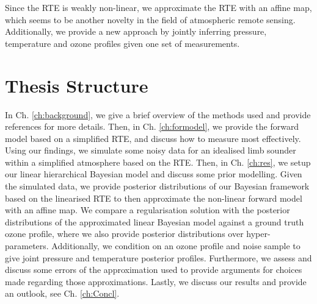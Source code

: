 Since the RTE is weakly non-linear, we approximate the RTE with an affine map, which seems to be another novelty in the field of atmospheric remote sensing.
Additionally, we provide a new approach by jointly inferring pressure, temperature and ozone profiles given one set of measurements.



\section{Thesis Structure}
In Ch. \ref{ch:background}, we give a brief overview of the methods used and provide references for more details.
Then, in Ch. \ref{ch:formodel}, we provide the forward model based on a simplified RTE, and discuss how to measure most effectively.
Using our findings, we simulate some noisy data for an idealised limb sounder within a simplified atmosphere based on the RTE.
Then, in Ch. \ref{ch:res}, we setup our linear hierarchical Bayesian model and discuss some prior modelling.
Given the simulated data, we provide posterior distributions of our Bayesian framework based on the linearised RTE to then approximate the non-linear forward model with an affine map. 
We compare a regularisation solution with the posterior distributions of the approximated linear Bayesian model against a ground truth ozone profile, where we also provide posterior distributions over hyper-parameters.
Additionally, we condition on an ozone profile and noise sample to give joint pressure and temperature posterior profiles.
Furthermore, we assess and discuss some errors of the approximation used to provide arguments for choices made regarding those approximations.
Lastly, we discuss our results and provide an outlook, see Ch. \ref{ch:Concl}.